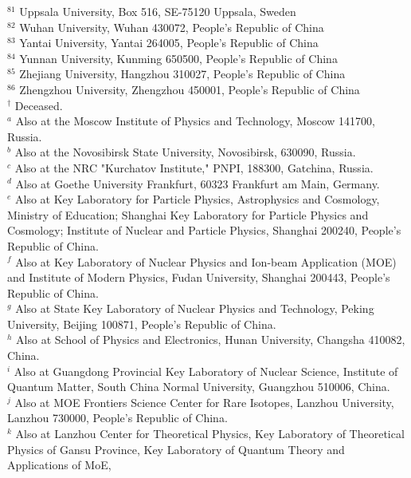 \documentclass[aps,amsmath,amssymb,reprint]{revtex4-2}
\begin{document}
\begin{widetext}
\begin{center}
{$^{81}$ Uppsala University, Box 516, SE-75120 Uppsala, Sweden\\
$^{82}$ Wuhan University, Wuhan 430072, People's Republic of China\\
$^{83}$ Yantai University, Yantai 264005, People's Republic of China\\
$^{84}$ Yunnan University, Kunming 650500, People's Republic of China\\
$^{85}$ Zhejiang University, Hangzhou 310027, People's Republic of China\\
$^{86}$ Zhengzhou University, Zhengzhou 450001, People's Republic of China\\
\vspace{0.2cm}
$^{\dagger}$ Deceased.\\
$^{a}$ Also at the Moscow Institute of Physics and Technology, Moscow 141700, Russia.\\
$^{b}$ Also at the Novosibirsk State University, Novosibirsk, 630090, Russia.\\
$^{c}$ Also at the NRC "Kurchatov Institute," PNPI, 188300, Gatchina, Russia.\\
$^{d}$ Also at Goethe University Frankfurt, 60323 Frankfurt am Main, Germany.\\
$^{e}$ Also at Key Laboratory for Particle Physics, Astrophysics and Cosmology, Ministry of Education; Shanghai Key Laboratory for Particle Physics and Cosmology; Institute of Nuclear and Particle Physics, Shanghai 200240, People's Republic of China.\\
$^{f}$ Also at Key Laboratory of Nuclear Physics and Ion-beam Application (MOE) and Institute of Modern Physics, Fudan University, Shanghai 200443, People's Republic of China.\\
$^{g}$ Also at State Key Laboratory of Nuclear Physics and Technology, Peking University, Beijing 100871, People's Republic of China.\\
$^{h}$ Also at School of Physics and Electronics, Hunan University, Changsha 410082, China.\\
$^{i}$ Also at Guangdong Provincial Key Laboratory of Nuclear Science, Institute of Quantum Matter, South China Normal University, Guangzhou 510006, China.\\
$^{j}$ Also at MOE Frontiers Science Center for Rare Isotopes, Lanzhou University, Lanzhou 730000, People's Republic of China.\\
$^{k}$ Also at
Lanzhou Center for Theoretical Physics,
Key Laboratory of Theoretical Physics of Gansu Province,
Key Laboratory of Quantum Theory and Applications of MoE,
}
\end{center}
\end{widetext}
\end{document}
